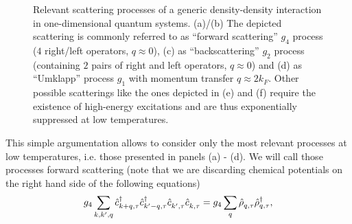 \begin{figure}
    \caption{Relevant scattering processes of a generic density-density interaction in one-dimensional quantum systems. (a)/(b) The depicted scattering is commonly referred to as ``forward scattering'' $g_4$ process ($4$ right/left operators, $q\approx0$), (c) as ``backscattering'' $g_2$ process (containing $2$ pairs of right and left operators, $q\approx0$) and (d) as ``Umklapp'' process $g_1$ with momentum transfer $q\approx 2k_F$. Other possible scatterings like the ones depicted in (e) and (f) require the existence of high-energy excitations and are thus exponentially suppressed at low temperatures.}
    \label{fig:scattering_processes}
\end{figure}
This simple argumentation allows to consider only the most relevant processes at low temperatures, i.e. those presented in panels (a) - (d).
We will call those processes forward scattering (note that we are discarding chemical potentials on the right hand side of the following equations)
\begin{align}
    g_4\sum_{k,k',q}\hat c^\dag_{k+q,\tau}\hat c^\dag_{k'-q,\tau}\hat c^\pdag_{k',\tau}\hat c^\pdag_{k,\tau} = g_4 \sum_q\hat\rho^\pdag_{q,\tau}\hat\rho^\dag_{q,\tau},
\end{align}
